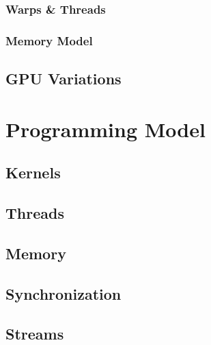 \documentclass[12px,oz]{report}
\theoremstyle{indented}
\theoremstyle{indented}
\begin{document}
		\subsection{Warps \& Threads}
		\label{sec-hw-warps-threads}
		

		\subsection{Memory Model}
		\label{sec-hw-memory-model}
		

	\section{GPU Variations}
	\label{sec-hw-variations}
	


\chapter{Programming Model}
\label{ch-programming-model}


	\section{Kernels}
	\label{sec-pm-kernels}
	

	\section{Threads}
	\label{sec-pm-threads}
	
	
	\section{Memory}
	\label{sec-pm-memory}
	
	
	\section{Synchronization}
	\label{sec-pm-synch}
	
	
	\section{Streams}
	\label{sec-pm-streams}
		
	
\end{document}
